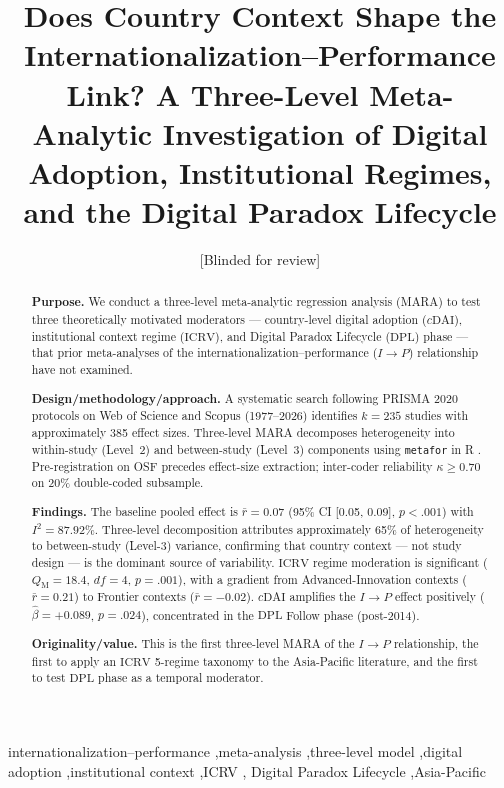 \documentclass[review,authoryear]{elsarticle}
\newcommand{\kstudies}{k}                   %
\newcommand{\rbar}{\bar{r}}                 %
\newcommand{\Isq}{I^{2}}                    %
\newcommand{\cDAI}{c\mathrm{DAI}}           %
\newcommand{\ICRV}{\mathrm{ICRV}}
\newcommand{\DPL}{\mathrm{DPL}}
\newcommand{\QM}{Q_{\mathrm{M}}}
\begin{document}
\begin{frontmatter}

\title{Does Country Context Shape the Internationalization--Performance Link?
  A Three-Level Meta-Analytic Investigation of Digital Adoption,
  Institutional Regimes, and the Digital Paradox Lifecycle}

\author[ctu]{[Blinded for review]}
\address[ctu]{[Blinded for review]}

\begin{abstract}
\textbf{Purpose.} We conduct a three-level meta-analytic regression analysis
(MARA) to test three theoretically motivated moderators --- country-level
digital adoption (\(\cDAI\)), institutional context regime (\(\ICRV\)), and
Digital Paradox Lifecycle (\(\DPL\)) phase --- that prior meta-analyses of the
internationalization--performance (\(I \to P\)) relationship have not examined.

\textbf{Design/methodology/approach.}  A systematic search following PRISMA
2020 protocols on Web of Science and Scopus (1977--2026) identifies
\(\kstudies = 235\) studies with approximately 385 effect sizes.  Three-level
MARA \parencite{Cheung2014, VandenNoortgate2013} decomposes heterogeneity into
within-study (Level~2) and between-study (Level~3) components using
\texttt{metafor} in R \parencite{Viechtbauer2010}.  Pre-registration on OSF
precedes effect-size extraction; inter-coder reliability \(\kappa \geq 0.70\)
on 20\% double-coded subsample.

\textbf{Findings.}  The baseline pooled effect is \(\rbar = 0.07\)
(95\% CI [0.05, 0.09], \(p < .001\)) with \(\Isq = 87.92\%\).  Three-level
decomposition attributes approximately 65\% of heterogeneity to between-study
(Level-3) variance, confirming that country context --- not study design ---
is the dominant source of variability.  \(\ICRV\) regime moderation is
significant (\(\QM = 18.4\), \(df = 4\), \(p = .001\)), with a gradient from
Advanced-Innovation contexts (\(\rbar = 0.21\)) to Frontier contexts
(\(\rbar = -0.02\)).  \(\cDAI\) amplifies the \(I \to P\) effect positively
(\(\hat{\beta} = +0.089\), \(p = .024\)), concentrated in the \(\DPL\)
Follow phase (post-2014).

\textbf{Originality/value.}  This is the first three-level MARA of the
\(I \to P\) relationship, the first to apply an \(\ICRV\) 5-regime taxonomy
to the Asia-Pacific literature, and the first to test \(\DPL\) phase as a
temporal moderator.
\end{abstract}

\begin{keyword}
internationalization--performance \sep meta-analysis \sep three-level model
\sep digital adoption \sep institutional context \sep ICRV \sep
Digital Paradox Lifecycle \sep Asia-Pacific
\end{keyword}

\end{frontmatter}
\end{document}
